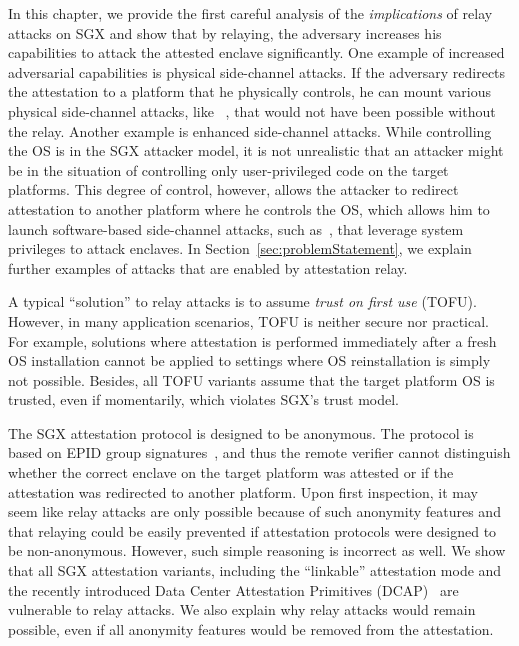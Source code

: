 In this chapter, we provide the first careful analysis of the \emph{implications} of relay attacks on SGX and show that by relaying, the adversary increases his capabilities to attack the attested enclave significantly. One example of increased adversarial capabilities is physical side-channel attacks. If the adversary redirects the attestation to a platform that he physically controls, he can mount various physical side-channel attacks, like ~\cite{genkin2016physical,wang2006covert,gandolfi2001electromagnetic, shamir2004acoustic}, that would not have been possible without the relay. Another example is enhanced side-channel attacks. While controlling the OS is in the SGX attacker model, it is not unrealistic that an attacker might be in the situation of controlling only user-privileged code on the target platforms. This degree of control, however, allows the attacker to redirect attestation to another platform where he controls the OS, which allows him to launch software-based side-channel attacks, such as~\cite{moghimi2017cachezoom, sgxcache, gotzfried2017cache}, that leverage system privileges to attack enclaves. In Section~\ref{sec:problemStatement}, we explain further examples of attacks that are enabled by attestation relay.



A typical ``solution'' to relay attacks is to assume \emph{trust on first use} (TOFU). However, in many application scenarios, TOFU is neither secure nor practical. For example, solutions where attestation is performed immediately after a fresh OS installation cannot be applied to settings where OS reinstallation is simply not possible. Besides, all TOFU variants assume that the target platform OS is trusted, even if momentarily, which violates SGX's trust model. %



The SGX attestation protocol is designed to be anonymous. The protocol is based on EPID group signatures~\cite{epid_attestation}, and thus the remote verifier cannot distinguish whether the correct enclave on the target platform was attested or if the attestation was redirected to another platform. Upon first inspection, it may seem like relay attacks are only possible because of such anonymity features and that relaying could be easily prevented if attestation protocols were designed to be non-anonymous. However, such simple reasoning is incorrect as well. 
%
We show that all SGX attestation variants, including the ``linkable'' attestation mode and the recently introduced Data Center Attestation Primitives (DCAP)~\cite{DCAP} are vulnerable to relay attacks. We also explain why relay attacks would remain possible, even if all anonymity features would be removed from the attestation.



